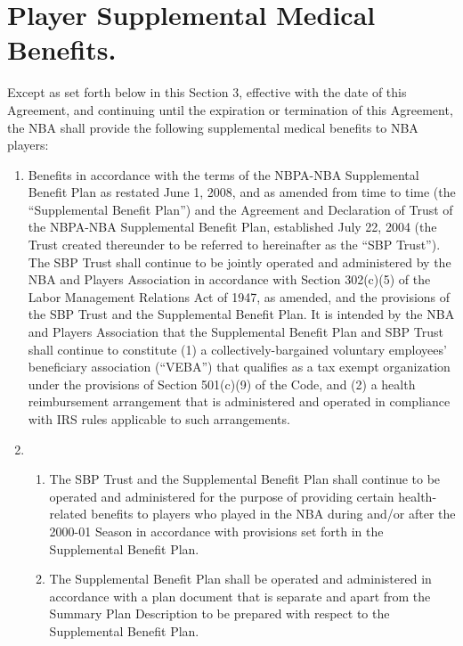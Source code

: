 \documentclass[
]{book}
\providecommand{\tightlist}{%
  \setlength{\itemsep}{0pt}\setlength{\parskip}{0pt}}
\begin{document}
\hypertarget{player-supplemental-medical-benefits.}{%
\section{Player Supplemental Medical Benefits.}\label{player-supplemental-medical-benefits.}}

Except as set forth below in this Section 3, effective with the date of this Agreement, and continuing until the expiration or termination of this Agreement, the NBA shall provide the following supplemental medical benefits to NBA players:

\begin{enumerate}
\def\labelenumi{(\alph{enumi})}
\item
  Benefits in accordance with the terms of the NBPA-NBA Supplemental Benefit Plan as restated June 1, 2008, and as amended from time to time (the ``Supplemental Benefit Plan'') and the Agreement and Declaration of Trust of the NBPA-NBA Supplemental Benefit Plan, established July 22, 2004 (the Trust created thereunder to be referred to hereinafter as the ``SBP Trust''). The SBP Trust shall continue to be jointly operated and administered by the NBA and Players Association in accordance with Section 302(c)(5) of the Labor Management Relations Act of 1947, as amended, and the provisions of the SBP Trust and the Supplemental Benefit Plan. It is intended by the NBA and Players Association that the Supplemental Benefit Plan and SBP Trust shall continue to constitute (1) a collectively-bargained voluntary employees' beneficiary association (``VEBA'') that qualifies as a tax exempt organization under the provisions of Section 501(c)(9) of the Code, and (2) a health reimbursement arrangement that is administered and operated in compliance with IRS rules applicable to such arrangements.
\item
  \begin{enumerate}
  \def\labelenumii{(\arabic{enumii})}
  \tightlist
  \item
    The SBP Trust and the Supplemental Benefit Plan shall continue to be operated and administered for the purpose of providing certain health-related benefits to players who played in the NBA during and/or after the 2000-01 Season in accordance with provisions set forth in the Supplemental Benefit Plan.
  \item
    The Supplemental Benefit Plan shall be operated and administered in accordance with a plan document that is separate and apart from the Summary Plan Description to be prepared with respect to the Supplemental Benefit Plan.

\end{enumerate}
\end{enumerate}
\end{document}
